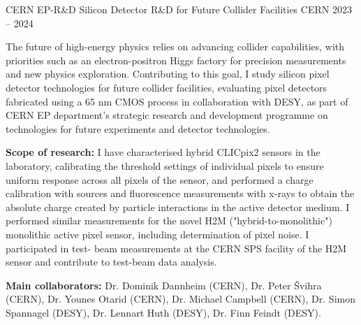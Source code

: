 \begin{cventries}
\cventry
{CERN EP-R\&D} %
{Silicon Detector R\&D for Future Collider Facilities} %
{CERN} %
{2023 -- 2024} %
{
\begin{cvitems} %
\item {The future of high-energy physics relies on advancing collider capabilities, with priorities such as an electron-positron Higgs factory for precision measurements and new physics exploration.
Contributing to this goal, I study silicon pixel detector technologies for future collider facilities, evaluating pixel detectors fabricated using a 65 nm CMOS process in collaboration with DESY, as part of CERN EP department's strategic research and development programme on technologies for future experiments and detector technologies.}
\item \textbf{Scope of research:} I have characterised hybrid CLICpix2 sensors in the laboratory, calibrating the threshold settings of individual pixels to ensure uniform response across all pixels of the sensor, and performed a charge calibration with sources and fluorescence measurements with x-rays to obtain the absolute charge created by particle interactions in the active detector medium. I performed similar measurements for the novel H2M ("hybrid-to-monolithic")
monolithic active pixel sensor, including determination of pixel noise. I participated in test-
beam measurements at the CERN SPS facility of the H2M sensor and contribute to test-beam
data analysis.
\item \textbf{Main collaborators:} Dr. Dominik Dannheim (CERN), Dr. Peter Švihra (CERN), Dr. Younes
Otarid (CERN), Dr. Michael Campbell (CERN), Dr. Simon Spannagel (DESY), Dr. Lennart
Huth (DESY), Dr. Finn Feindt (DESY).
\end{cvitems}
}


\end{cventries}
